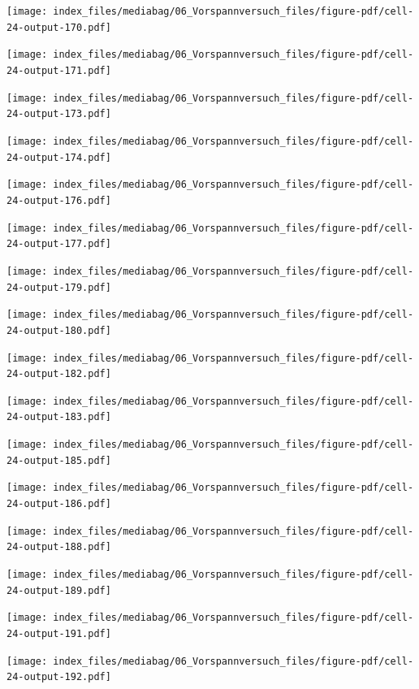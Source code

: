 \documentclass[
  11pt,
  letterpaper,
]{scrreprt}
\begin{document}
\newpage{}

\texttt{[image: index\_files/mediabag/06\_Vorspannversuch\_files/figure-pdf/cell-24-output-170.pdf]}

\texttt{[image: index\_files/mediabag/06\_Vorspannversuch\_files/figure-pdf/cell-24-output-171.pdf]}

\newpage{}

\texttt{[image: index\_files/mediabag/06\_Vorspannversuch\_files/figure-pdf/cell-24-output-173.pdf]}

\texttt{[image: index\_files/mediabag/06\_Vorspannversuch\_files/figure-pdf/cell-24-output-174.pdf]}

\newpage{}

\texttt{[image: index\_files/mediabag/06\_Vorspannversuch\_files/figure-pdf/cell-24-output-176.pdf]}

\texttt{[image: index\_files/mediabag/06\_Vorspannversuch\_files/figure-pdf/cell-24-output-177.pdf]}

\newpage{}

\texttt{[image: index\_files/mediabag/06\_Vorspannversuch\_files/figure-pdf/cell-24-output-179.pdf]}

\texttt{[image: index\_files/mediabag/06\_Vorspannversuch\_files/figure-pdf/cell-24-output-180.pdf]}

\newpage{}

\texttt{[image: index\_files/mediabag/06\_Vorspannversuch\_files/figure-pdf/cell-24-output-182.pdf]}

\texttt{[image: index\_files/mediabag/06\_Vorspannversuch\_files/figure-pdf/cell-24-output-183.pdf]}

\newpage{}

\texttt{[image: index\_files/mediabag/06\_Vorspannversuch\_files/figure-pdf/cell-24-output-185.pdf]}

\texttt{[image: index\_files/mediabag/06\_Vorspannversuch\_files/figure-pdf/cell-24-output-186.pdf]}

\newpage{}

\texttt{[image: index\_files/mediabag/06\_Vorspannversuch\_files/figure-pdf/cell-24-output-188.pdf]}

\texttt{[image: index\_files/mediabag/06\_Vorspannversuch\_files/figure-pdf/cell-24-output-189.pdf]}

\newpage{}

\texttt{[image: index\_files/mediabag/06\_Vorspannversuch\_files/figure-pdf/cell-24-output-191.pdf]}

\texttt{[image: index\_files/mediabag/06\_Vorspannversuch\_files/figure-pdf/cell-24-output-192.pdf]}
\end{document}
